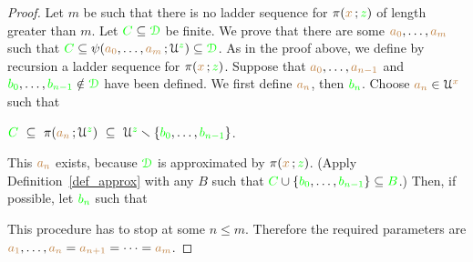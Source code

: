\begin{proof}
Let $m$ be such that there is no ladder sequence for $\pi({\color{brown} x}\,;{\color{green} z})$ of length greater than $m$.
Let ${\color{green} C}\subseteq{\color{green}\EuScript D}$ be finite.
We prove that there are some ${\color{brown} a_0},\dots,{\color{brown} a_m}$ such that ${\color{green} C}\subseteq\psi({\color{brown} a_0},\dots,{\color{brown} a_m}\,;\EuScript U^{\color{green} z})\subseteq{\color{green}\EuScript D}$.
As in the proof above, we define by recursion a ladder sequence for $\pi({\color{brown} x}\,;{\color{green} z})$.
Suppose that ${\color{brown} a_0},\dots,{\color{brown} a_{n-1}}$ and ${\color{green} b_0},\dots,{\color{green} b_{n-1}}\notin{\color{green}\EuScript D}$ have been defined.
We first define ${\color{brown} a_n}$, then ${\color{green} b_n}$. 
Choose ${\color{brown} a_n}\in\EuScript U^{\color{brown} x}$ such that 

\hfil${\color{green} C}\ \subseteq\ \pi({\color{brown} a_n}\,;\EuScript U^{\color{green} z})\ \subseteq\ \EuScript U^{\color{green} z}\smallsetminus\{{\color{green} b_0},\dots,{\color{green} b_{n-1}}\}$.

This ${\color{brown} a_n}$ exists, because ${\color{green}\EuScript D}$ is approximated by $\pi({\color{brown} x}\,;{\color{green} z})$.
(Apply Definition~\ref{def_approx} with any $B$ such that ${\color{green} C}\cup\{{\color{green} b_0},\dots,{\color{green} b_{n-1}}\}\subseteq{\color{green}B}$.)
Then, if possible, let ${\color{green} b_n}$ such that


This procedure has to stop at some $n\le m$.
Therefore the required parameters are ${\color{brown} a_1},\dots,{\color{brown} a_n}={\color{brown} a_{n+1}}=\dots={\color{brown} a_{m}}$.
\end{proof}





